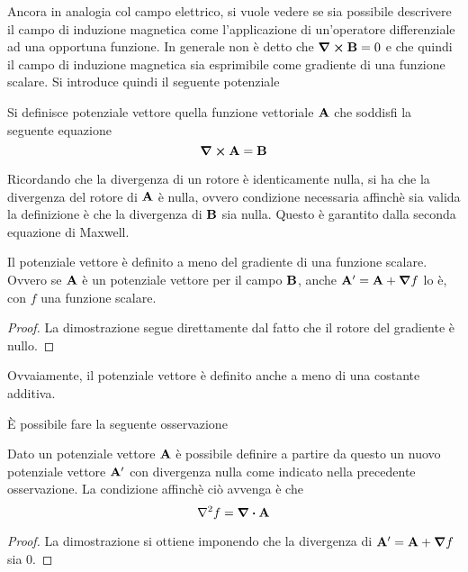 Ancora in analogia col campo elettrico, si vuole vedere se sia possibile descrivere il campo di induzione magnetica
come l'applicazione di un'operatore differenziale ad una opportuna funzione.
In generale non è detto che $\curl{\vb{B}}=0$ e che quindi il campo di induzione magnetica sia esprimibile come
gradiente di una funzione scalare.
Si introduce quindi il seguente potenziale
\begin{defn}
    Si definisce potenziale vettore quella funzione vettoriale $\vb{A}$ che soddisfi la seguente equazione
    \begin{equation}
        \label{eqn:def_potenziale_vettore}
        \curl{\vb{A}}=\vb{B}
    \end{equation}
\end{defn}
Ricordando che la divergenza di un rotore è identicamente nulla,
si ha che la divergenza del rotore di $\vb{A}$ è nulla, ovvero condizione necessaria affinchè sia valida la
definizione è che la divergenza di $\vb{B}$ sia nulla. Questo è garantito dalla seconda equazione di Maxwell.
\begin{obs}
    Il potenziale vettore è definito a meno del gradiente di una funzione scalare.
    Ovvero se $\vb{A}$ è un potenziale vettore per il campo $\vb{B}$, anche $\vb{A'}=\vb{A}+\grad{f}$ lo è, con $f$ una funzione scalare.
\end{obs}
\begin{proof}
    La dimostrazione segue direttamente dal fatto che il rotore del gradiente è nullo.
\end{proof}
Ovvaiamente, il potenziale vettore è definito anche a meno di una costante additiva.

È possibile fare la seguente osservazione
\begin{obs}
    Dato un potenziale vettore $\vb{A}$ è possibile definire a partire da questo un nuovo potenziale vettore $\vb{A}'$
    con divergenza nulla come indicato nella precedente osservazione. La condizione affinchè ciò avvenga è che
    \[
        \laplacian{f}=\div{\vb{A}}
    \]
\end{obs}
\begin{proof}
    La dimostrazione si ottiene imponendo che la divergenza di $\vb{A'}=\vb{A}+\grad{f}$ sia $0$.
\end{proof}

